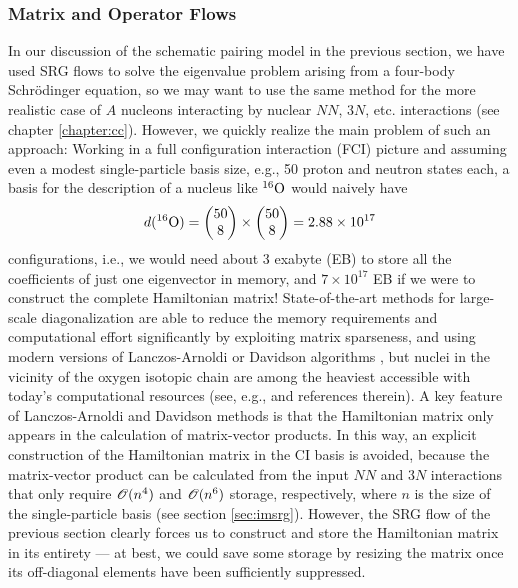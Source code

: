 
\subsubsection{Matrix and Operator Flows}
In our discussion of the schematic pairing model in the previous section, we 
have used SRG flows to solve the eigenvalue problem arising from a four-body 
Schr\"odinger equation, so we may want to use the same method for the more 
realistic case of $A$ nucleons interacting by nuclear $NN$, $3N$, etc. 
interactions (see chapter \ref{chapter:cc}). However, we quickly realize the
main problem of such an approach: Working in a full configuration interaction (FCI) 
picture
and assuming even a modest single-particle basis size, e.g., 50 proton and neutron 
states each, a basis for the description of a nucleus like $\nuc{O}{16}$ would 
naively have
\begin{equation}
 d(\nuc{O}{16}) = \begin{pmatrix} 50 \\ 8\end{pmatrix} \times 
           \begin{pmatrix} 50 \\ 8\end{pmatrix}
                = 2.88\times10^{17}
\end{equation}
configurations, i.e., we would need about 3 exabyte (EB) to store all the coefficients
of just one eigenvector in memory, and $7\times10^{17}$ EB if we were to construct
the complete Hamiltonian matrix! State-of-the-art methods for large-scale 
diagonalization are able to reduce the memory requirements and computational
effort significantly by exploiting matrix sparseness, and using modern versions of
Lanczos-Arnoldi \cite{Lanczos:1950sp,Arnoldi:1951kk} or Davidson algorithms 
\cite{Davidson:1989pi}, but nuclei in the vicinity of the oxygen isotopic 
chain are among the heaviest accessible with today's computational
resources (see, e.g., \cite{Yang:2013ly,Barrett:2013oq} and references therein).
A key feature of Lanczos-Arnoldi and Davidson methods is that the
Hamiltonian matrix only appears in the calculation
of matrix-vector products. In this way, an explicit construction of the Hamiltonian
matrix in the CI basis is avoided, because the matrix-vector product can be
calculated from the input $NN$ and $3N$ interactions that only require $\OC(n^4)$ 
and $\OC(n^6)$ storage, respectively, where $n$ is the size of the single-particle
basis (see section \ref{sec:imsrg}). However, the SRG flow of the previous section 
clearly forces us to construct
and store the Hamiltonian matrix in its entirety --- at best, we could save some
storage by resizing the matrix once its off-diagonal elements have been 
sufficiently suppressed.

